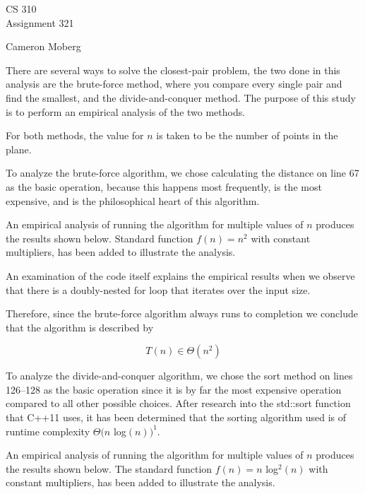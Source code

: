 \documentclass[11pt]{article}
\begin{document}
\thispagestyle{empty}
\begin{center}
{\large CS 310}\\
Assignment 321
\end{center}

\begin{flushright}
Cameron Moberg
\end{flushright}

There are several ways to solve the closest-pair problem, the two done in this analysis are the brute-force method, where you compare every single pair and find the smallest, and the divide-and-conquer method. The purpose of this study is to perform an empirical analysis of the two methods.

For both methods, the value for $n$ is taken to be the number of points in the plane.

To analyze the brute-force algorithm, we chose calculating the distance on line 67 as the basic operation, because this happens most frequently, is the most expensive, and is the philosophical heart of this algorithm.

An empirical analysis of running the algorithm for multiple values of
$n$ produces the results shown below. Standard function $f(n) = n^2$ with constant multipliers, has been added to
illustrate the analysis.

\begin{center}
    
\end{center}

An examination of the code itself explains the empirical results when we observe that there is a doubly-nested for loop that iterates over the input size. 

Therefore, since the brute-force algorithm always runs to completion we conclude that the algorithm is described by

\[
T(n) \in \Theta( n^{2} )
\]

\clearpage
To analyze the divide-and-conquer algorithm, we chose the sort method on lines 126--128 as the basic operation since it is by far the most expensive operation compared to all other possible choices. After research into the std::sort function that C++11 uses, it has been determined that the sorting algorithm used is of runtime complexity $\Theta(n$ log$(n))^1$.

An empirical analysis of running the algorithm for multiple values of
$n$ produces the results shown below. The standard function $f(n) = n$ log$^2(n)$ with constant multipliers, has been added to
illustrate the analysis.
\end{document}
